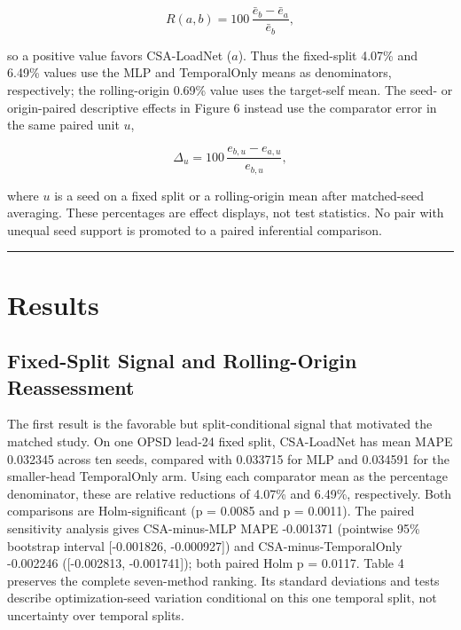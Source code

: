 \documentclass[electronics,article,submit,moreauthors]{Definitions/mdpi}
\begin{document}
\[
R(a,b)=100\,\frac{\bar e_b-\bar e_a}{\bar e_b},
\]

so a positive value favors CSA-LoadNet (\(a\)). Thus the fixed-split 4.07\% and 6.49\% values use the MLP and TemporalOnly means as denominators, respectively; the rolling-origin 0.69\% value uses the target-self mean. The seed- or origin-paired descriptive effects in Figure 6 instead use the comparator error in the same paired unit \(u\),

\[
\Delta_u=100\,\frac{e_{b,u}-e_{a,u}}{e_{b,u}},
\]

where \(u\) is a seed on a fixed split or a rolling-origin mean after matched-seed averaging. These percentages are effect displays, not test statistics. No pair with unequal seed support is promoted to a paired inferential comparison.

\begin{center}\rule{0.5\linewidth}{0.5pt}\end{center}

\section{Results}\label{results}

\subsection{Fixed-Split Signal and Rolling-Origin Reassessment}\label{fixed-split-signal-and-rolling-origin-reassessment}

The first result is the favorable but split-conditional signal that motivated the matched study. On one OPSD lead-24 fixed split, CSA-LoadNet has mean MAPE 0.032345 across ten seeds, compared with 0.033715 for MLP and 0.034591 for the smaller-head TemporalOnly arm. Using each comparator mean as the percentage denominator, these are relative reductions of 4.07\% and 6.49\%, respectively. Both comparisons are Holm-significant (p = 0.0085 and p = 0.0011). The paired sensitivity analysis gives CSA-minus-MLP MAPE -0.001371 (pointwise 95\% bootstrap interval {[}-0.001826, -0.000927{]}) and CSA-minus-TemporalOnly -0.002246 ({[}-0.002813, -0.001741{]}); both paired Holm p = 0.0117. Table 4 preserves the complete seven-method ranking. Its standard deviations and tests describe optimization-seed variation conditional on this one temporal split, not uncertainty over temporal splits.
\end{document}
